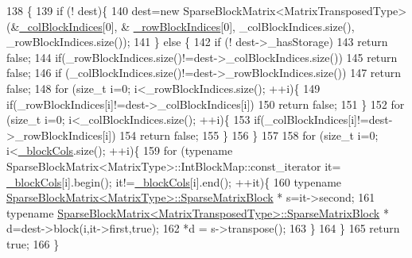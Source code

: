\begin{DoxyCode}
138                                                                                                     \{
139     \textcolor{keywordflow}{if} (! dest)\{
140       dest=\textcolor{keyword}{new} SparseBlockMatrix<MatrixTransposedType>(&\hyperlink{classg2o_1_1SparseBlockMatrix_aca008740c37d2d00b90f696ab19abb59}{\_colBlockIndices}[0], &
      \hyperlink{classg2o_1_1SparseBlockMatrix_ab0bd9c6d5b7b8704af1bc679032382e3}{\_rowBlockIndices}[0], \_colBlockIndices.size(), \_rowBlockIndices.size());
141     \} \textcolor{keywordflow}{else} \{
142       \textcolor{keywordflow}{if} (! dest->\_hasStorage)
143         \textcolor{keywordflow}{return} \textcolor{keyword}{false};
144       \textcolor{keywordflow}{if}(\_rowBlockIndices.size()!=dest->\_colBlockIndices.size())
145         \textcolor{keywordflow}{return} \textcolor{keyword}{false};
146       \textcolor{keywordflow}{if} (\_colBlockIndices.size()!=dest->\_rowBlockIndices.size())
147         \textcolor{keywordflow}{return}  \textcolor{keyword}{false};
148       \textcolor{keywordflow}{for} (\textcolor{keywordtype}{size\_t} i=0; i<\_rowBlockIndices.size(); ++i)\{
149         \textcolor{keywordflow}{if}(\_rowBlockIndices[i]!=dest->\_colBlockIndices[i])
150           \textcolor{keywordflow}{return} \textcolor{keyword}{false};
151       \}
152       \textcolor{keywordflow}{for} (\textcolor{keywordtype}{size\_t} i=0; i<\_colBlockIndices.size(); ++i)\{
153         \textcolor{keywordflow}{if}(\_colBlockIndices[i]!=dest->\_rowBlockIndices[i])
154           \textcolor{keywordflow}{return} \textcolor{keyword}{false};
155       \}
156     \}
157 
158     \textcolor{keywordflow}{for} (\textcolor{keywordtype}{size\_t} i=0; i<\hyperlink{classg2o_1_1SparseBlockMatrix_ae236d56a01ba4d292450a518621b41f8}{\_blockCols}.size(); ++i)\{
159       \textcolor{keywordflow}{for} (\textcolor{keyword}{typename} SparseBlockMatrix<MatrixType>::IntBlockMap::const\_iterator it=
      \hyperlink{classg2o_1_1SparseBlockMatrix_ae236d56a01ba4d292450a518621b41f8}{\_blockCols}[i].begin(); it!=\hyperlink{classg2o_1_1SparseBlockMatrix_ae236d56a01ba4d292450a518621b41f8}{\_blockCols}[i].end(); ++it)\{
160         \textcolor{keyword}{typename} \hyperlink{classg2o_1_1SparseBlockMatrix_ab2f7376cbf055803fda6527dcc43e3be}{SparseBlockMatrix<MatrixType>::SparseMatrixBlock}
      * s=it->second;
161         \textcolor{keyword}{typename} \hyperlink{classg2o_1_1SparseBlockMatrix_ab2f7376cbf055803fda6527dcc43e3be}{SparseBlockMatrix<MatrixTransposedType>::SparseMatrixBlock}
      * d=dest->block(i,it->first,\textcolor{keyword}{true});
162         *d = s->transpose();
163       \}
164     \}
165     \textcolor{keywordflow}{return} \textcolor{keyword}{true};
166   \}
\end{DoxyCode}
